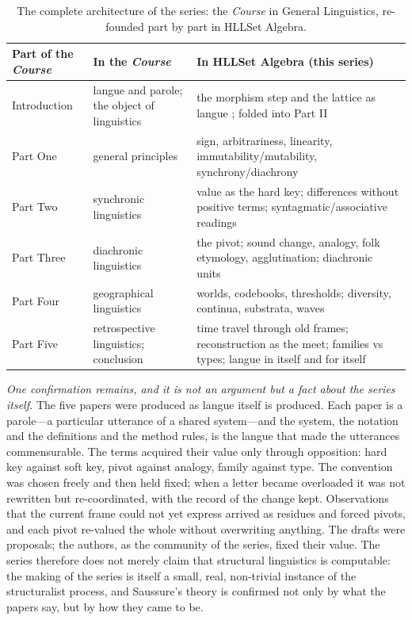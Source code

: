 \documentclass[11pt,a4paper]{article}
\theoremstyle{remark}
\begin{document}
\begin{table}[htbp]
\centering
\renewcommand{\arraystretch}{1.15}
\begin{tabular}{@{}>{\raggedright\arraybackslash}p{3.2cm}
                    >{\raggedright\arraybackslash}p{4.2cm}
                    >{\raggedright\arraybackslash}p{7.2cm}@{}}
\toprule
Part of the \textit{Course} & In the \textit{Course} & In HLLSet Algebra (this series) \\
\midrule
Introduction & langue and parole; the object of linguistics & the morphism
step and the lattice as langue \cite{langue2026}; folded into Part II \\
Part One & general principles & sign, arbitrariness, linearity,
immutability/mutability, synchrony/diachrony \cite{part1} \\
Part Two & synchronic linguistics & value as the hard key; differences
without positive terms; syntagmatic/associative readings \cite{part2} \\
Part Three & diachronic linguistics & the pivot; sound change, analogy, folk
etymology, agglutination; diachronic units \cite{part3} \\
Part Four & geographical linguistics & worlds, codebooks, thresholds;
diversity, continua, substrata, waves \cite{part4} \\
Part Five & retrospective linguistics; conclusion & time travel through old
frames; reconstruction as the meet; families vs types; langue in itself and
for itself \cite{part5} \\
\bottomrule
\end{tabular}
\caption{The complete architecture of the series: the \textit{Course} in
General Linguistics, re-founded part by part in HLLSet Algebra.}
\label{tab:series}
\end{table}

\emph{One confirmation remains, and it is not an argument but a fact about
the series itself.} The five papers were produced as langue itself is
produced. Each paper is a parole---a particular utterance of a shared
system---and the system, the notation and the definitions and the method
rules, is the langue that made the utterances commensurable. The terms
acquired their value only through opposition: hard key against soft key,
pivot against analogy, family against type. The convention was chosen freely
and then held fixed; when a letter became overloaded it was not rewritten but
re-coordinated, with the record of the change kept. Observations that the
current frame could not yet express arrived as residues and forced pivots,
and each pivot re-valued the whole without overwriting anything. The drafts
were proposals; the authors, as the community of the series, fixed their
value. The series therefore does not merely claim that structural
linguistics is computable: the making of the series is itself a small, real,
non-trivial instance of the structuralist process, and Saussure's theory is
confirmed not only by what the papers say, but by how they came to be.
\end{document}
